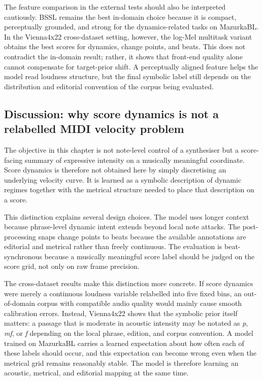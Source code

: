 The feature comparison in the external tests should also be interpreted cautiously. BSSL remains the best in-domain choice because it is compact, perceptually grounded, and strong for the dynamics-related tasks on MazurkaBL. In the Vienna4x22 cross-dataset setting, however, the log-Mel multitask variant obtains the best scores for dynamics, change points, and beats. This does not contradict the in-domain result; rather, it shows that front-end quality alone cannot compensate for target-prior shift. A perceptually aligned feature helps the model read loudness structure, but the final symbolic label still depends on the distribution and editorial convention of the corpus being evaluated.

\subsection{Discussion: why score dynamics is not a relabelled MIDI velocity problem}
\label{ssec:audiodyn_discussion}

The objective in this chapter is not note-level control of a synthesiser but a score-facing summary of expressive intensity on a musically meaningful coordinate. Score dynamics is therefore not obtained here by simply discretising an underlying velocity curve. It is learned as a symbolic description of dynamic regimes together with the metrical structure needed to place that description on a score.

This distinction explains several design choices. The model uses longer context because phrase-level dynamic intent extends beyond local note attacks. The post-processing snaps change points to beats because the available annotations are editorial and metrical rather than freely continuous. The evaluation is beat-synchronous because a musically meaningful score label should be judged on the score grid, not only on raw frame precision.

The cross-dataset results make this distinction more concrete. If score dynamics were merely a continuous loudness variable relabelled into five fixed bins, an out-of-domain corpus with compatible audio quality would mainly cause smooth calibration errors. Instead, Vienna4x22 shows that the symbolic prior itself matters: a passage that is moderate in acoustic intensity may be notated as \textit{p}, \textit{mf}, or \textit{f} depending on the local phrase, edition, and corpus convention. A model trained on MazurkaBL carries a learned expectation about how often each of these labels should occur, and this expectation can become wrong even when the metrical grid remains reasonably stable. The model is therefore learning an acoustic, metrical, and editorial mapping at the same time.

